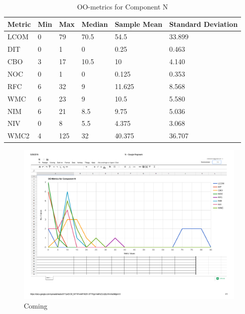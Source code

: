 \begin{table}[]
\centering
\caption{OO-metrics for Component N}
\label{tab:oometrics-netw}
\begin{tabular}{|l|l|l|l|l|l|}
\hline
\textbf{Metric} & \textbf{Min} & \textbf{Max} & \textbf{Median} & \textbf{Sample Mean} & \textbf{Standard Deviation} \\ \hline
LCOM            & 0            & 79           & 70.5            & 54.5                 & 33.899                      \\ \hline
DIT             & 0            & 1            & 0               & 0.25                 & 0.463                       \\ \hline
CBO             & 3            & 17           & 10.5            & 10                   & 4.140                       \\ \hline
NOC             & 0            & 1            & 0               & 0.125                & 0.353                       \\ \hline
RFC             & 6            & 32           & 9               & 11.625               & 8.568                       \\ \hline
WMC             & 6            & 23           & 9               & 10.5                 & 5.580                       \\ \hline
NIM             & 6            & 21           & 8.5             & 9.75                 & 5.036                       \\ \hline
NIV             & 0            & 8            & 5.5             & 4.375                & 3.068                       \\ \hline
WMC2            & 4            & 125          & 32              & 40.375                 & 36.707                      \\ \hline
\end{tabular}
\end{table}


\begin{landscape}
\setlength\LTleft{-.5in}
	\begin{figure}
	\centering
	\includegraphics[width=\textwidth]{images/network.pdf}
	\caption{Coming}
	\label{fig:netgraph}
	\end{figure}
\end{landscape}




